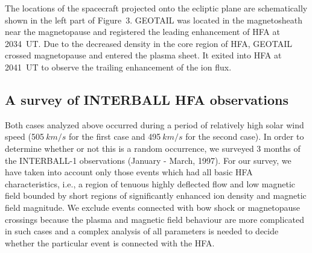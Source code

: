 \documentclass[11pt]{article}
\begin{document}
\begin{article}

The locations of the spacecraft projected onto the ecliptic plane are
schematically shown in the left part of Figure~3. GEOTAIL was
located in the magnetosheath near the magnetopause and registered
the leading enhancement of HFA at 2034~UT. Due to the decreased
density in the core region of HFA, GEOTAIL crossed magnetopause
and entered the plasma sheet. It exited into HFA at 2041~UT to
observe the trailing enhancement of the ion flux.



\subsection{A survey of INTERBALL HFA observations}
Both cases analyzed above occurred during a period of relatively
high solar wind speed (505$\>km/s$ for the first case and
495$\>km/s$ for the
second case). In order to determine whether or not this is a random
occurrence, we surveyed  3 months of the INTERBALL-1
observations (January - March, 1997).
For our survey, we have taken into account only those events
which had all basic HFA characteristics, i.e., a region of tenuous
highly deflected flow and low magnetic field bounded by short
regions of significantly enhanced ion density and magnetic field
magnitude. We exclude events connected with bow shock or
magnetopause crossings because the plasma and magnetic field
behaviour are more complicated in such cases and a complex
analysis of all parameters is needed to decide whether the particular
event is connected with the HFA.


\end{article}
\end{document}
